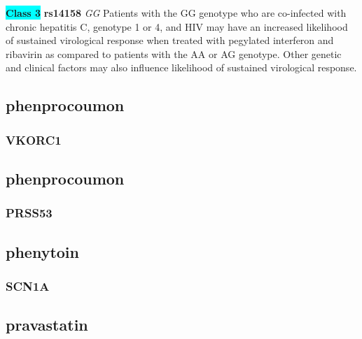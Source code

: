 \documentclass{book}
\begin{document}
\begin{center}
\textbf{\colorbox{cyan} {Class 3}} \textbf{ rs14158 } \textit{ GG }
Patients with the GG genotype who are co-infected with chronic hepatitis C, genotype 1 or 4, and HIV may have an increased likelihood of sustained virological response when treated with pegylated interferon and ribavirin as compared to patients with the AA or AG genotype. Other genetic and clinical factors may also influence likelihood of sustained virological response. 


\end{center}\subsection{ phenprocoumon }


\subsubsection{ VKORC1 }

\begin{center}



\end{center}\subsection{ phenprocoumon }


\subsubsection{ PRSS53 }

\begin{center}



\end{center}\subsection{ phenytoin }


\subsubsection{ SCN1A }

\begin{center}



\end{center}\subsection{ pravastatin }
\end{document}
